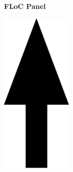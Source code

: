 \documentclass[a3paper]{article}
\begin{document}
\printGenericVSLHeaderBig
\begin{center}
\begin{vsltext}{3cm}{3.5cm}

    \vspace{1.5cm}

    \textbf{FLoC Panel} 


    \vspace{2cm}

    \includegraphics[height=8cm,keepaspectratio=true]{arrow_keynote.pdf}

\end{vsltext}

\end{center}
\end{document}
